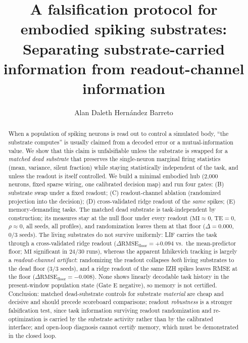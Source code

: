 \documentclass[12pt]{article}
\title{A falsification protocol for embodied spiking substrates: Separating substrate-carried information from readout-channel information}
\author{Alan Daleth Hernández Barreto}
\date{}
\begin{document}
\maketitle

\begin{abstract}
\noindent
When a population of spiking neurons is read out to control a simulated body, ``the substrate computes'' is usually claimed from a decoded error or a mutual-information value. We show that this claim is unfalsifiable unless the substrate is swapped for a \emph{matched dead substrate} that preserves the single-neuron marginal firing statistics (mean, variance, silent fraction) while staying statistically independent of the task, and unless the readout is itself controlled. We build a minimal embodied hub (2{,}000 neurons, fixed sparse wiring, one calibrated decision map) and run four gates: (B) substrate swap under a fixed readout; (C) readout-channel ablation (randomized projection into the decision); (D) cross-validated ridge readout of the \emph{same} spikes; (E) memory-demanding tasks. The matched dead substrate is task-independent by construction; its measures stay at the null floor under every readout ($\mathrm{MI}\approx0$, $\mathrm{TE}=0$, $\rho\approx0$, all seeds, all profiles), and randomization leaves them at that floor ($\Delta=0.000$, $0/3$ seeds). The living substrates do not survive uniformly: LIF carries the task through a cross-validated ridge readout ($\Delta\mathrm{RMSE}_{\mathrm{floor}}=+0.094$ vs.\ the mean-predictor floor; $\mathrm{MI}$ significant in $24/30$ runs), whereas the apparent Izhikevich tracking is largely a \emph{readout-channel artifact}: randomizing the readout collapses \emph{both} living substrates to the dead floor ($3/3$ seeds), and a ridge readout of the same IZH spikes leaves RMSE at the floor ($\Delta\mathrm{RMSE}_{\mathrm{floor}}=-0.008$). None shows linearly decodable task history in the present-window population state (Gate E negative), so memory is not certified. Conclusion: matched dead-substrate controls for substrate \emph{material} are cheap and decisive and should precede scoreboard comparisons; readout \emph{robustness} is a stronger falsification test, since task information surviving readout randomization and re-optimization is carried by the substrate activity rather than by the calibrated interface; and open-loop diagnosis cannot certify memory, which must be demonstrated in the closed loop.

\end{abstract}
\end{document}

